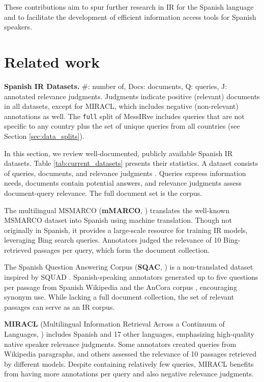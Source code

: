 \documentclass[11pt]{article}
\begin{document}
These contributions aim to spur further research in IR for the Spanish language and to facilitate the development of efficient information access tools for Spanish speakers.



\section{Related work} \label{sec:related_work}

\begin{table}[ht!]
  \centering
  
  \caption{\textbf{Spanish IR Datasets.}
    \#: number of, Docs: documents, Q: queries, J: annotated relevance judgments. Judgments indicate positive (relevant) documents in all datasets, except for MIRACL, which includes negative (non-relevant) annotations as well. The \texttt{full} split of MessIRve includes queries that are not specific to any country plus the set of unique queries from all countries (see Section \ref{sec:data_splits}).
  }
  \label{tab:current_datasets}
\end{table}


In this section, we review well-documented, publicly available Spanish IR datasets. Table \ref{tab:current_datasets} presents their statistics. A dataset consists of queries, documents, and relevance judgments \citep{thakur2021beir}. Queries express information needs, documents contain potential answers, and relevance judgments assess document-query relevance. The full document set is the corpus.


The multilingual MSMARCO (\textbf{mMARCO}, \citealp{bonifacio2021mmarco}) translates the well-known MSMARCO dataset \citep{bajaj2016ms} into Spanish using machine translation. Though not originally in Spanish, it provides a large-scale resource for training IR models, leveraging Bing search queries. Annotators judged the relevance of 10 Bing-retrieved passages per query, which form the document collection.


The Spanish Question Answering Corpus (\textbf{SQAC}, \citealp{gutierrez2022maria}) is a non-translated dataset inspired by SQUAD \citep{rajpurkar-etal-2016-squad}. Spanish-speaking annotators generated up to five questions per passage from Spanish Wikipedia and the AnCora corpus \citep{taule2008ancora}, encouraging synonym use. While lacking a full document collection, the set of relevant passages can serve as an IR corpus.


\textbf{MIRACL} (Multilingual Information Retrieval Across a Continuum of Languages, \citealp{zhang2023miracl}) includes Spanish and 17 other languages, emphasizing high-quality native speaker relevance judgments. Some annotators created queries from Wikipedia paragraphs, and others assessed the relevance of 10 passages retrieved by different models. Despite containing relatively few queries, MIRACL benefits from having more annotations per query and also negative relevance judgments.
\end{document}
